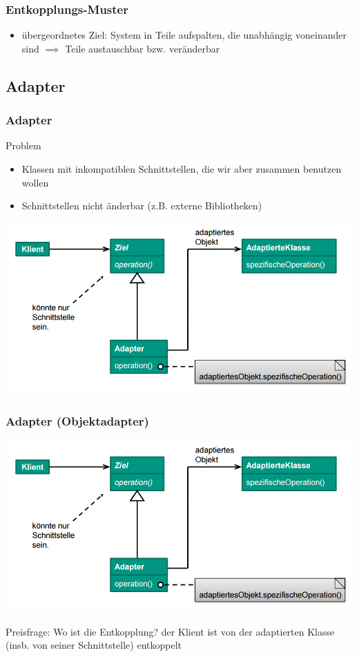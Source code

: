 \documentclass[18pt]{beamer}
\begin{document}
	\begin{frame}
		\frametitle{Entkopplungs-Muster}
		\begin{itemize}
			\item übergeordnetes Ziel: System in Teile aufspalten, die unabhängig voneinander sind
			\linebreak $\implies$ Teile austauschbar bzw. veränderbar
	\end{itemize}
	\end{frame}

	\subsection{Adapter}
	\begin{frame}
		\frametitle{Adapter}
		\begin{block}{Problem}
			\begin{itemize}
				\item Klassen mit inkompatiblen Schnittstellen, die wir aber zusammen benutzen wollen 
				\item Schnittstellen nicht änderbar (z.B. externe Bibliotheken)
			\end{itemize}
		\end{block}
		\pause
		\includegraphics[scale=0.45]{./pics/tut3/adap-obj.png}
	\end{frame}

	\begin{frame}
		\frametitle{Adapter (Objektadapter)}
		\includegraphics[scale=0.45]{./pics/tut3/adap-obj.png}
		\begin{block}{Preisfrage: Wo ist die Entkopplung?}
			\pause
			der Klient ist von der adaptierten Klasse (insb. von seiner Schnittstelle) entkoppelt
		\end{block}
	\end{frame}
\end{document}
